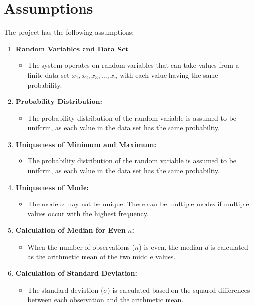 \documentclass[english,12pt,a4paper]{report}
\begin{document}
	\section{Assumptions}
	The project has the following assumptions:
	\begin{enumerate}
	\item \textbf{Random Variables and Data Set} 
	\begin{itemize}
		\item The system operates on random variables that can take values from a finite data set $x_1, x_2, x_3, \ldots, x_n$ with each value having the same probability.
	\end{itemize}

	\item \textbf{Probability Distribution:} 
	\begin{itemize}
	\item The probability distribution of the random variable is assumed to be uniform, as each value in the data set has the same probability.
	\end{itemize}
	
	\item \textbf{Uniqueness of Minimum and Maximum:} 
	\begin{itemize}
		\item The probability distribution of the random variable is assumed to be uniform, as each value in the data set has the same probability.
	\end{itemize}

	\item \textbf{Uniqueness of Mode:} 
	\begin{itemize}
	\item The mode $o$ may not be unique. There can be multiple modes if multiple values occur with the highest frequency.
	\end{itemize}
	
	\item \textbf{Calculation of Median for Even $n$:} 
	\begin{itemize}
		\item When the number of observations ($n$) is even, the median $d$ is calculated as the arithmetic mean of the two middle values.
	\end{itemize}

	\item \textbf{Calculation of Standard Deviation:} 
	\begin{itemize}
	\item The standard deviation ($\sigma$) is calculated based on the squared differences between each observation and the arithmetic mean.
	\end{itemize}


\end{enumerate}
\end{document}
